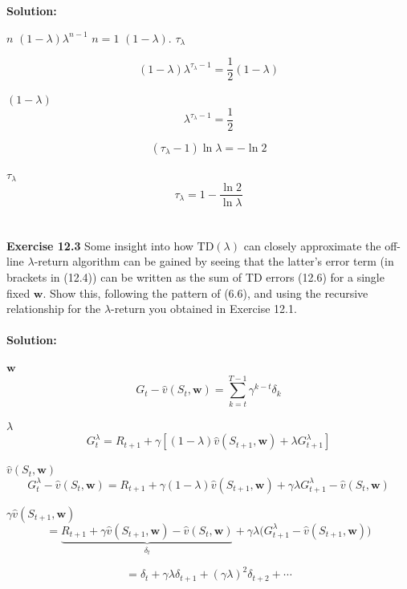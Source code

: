 \documentclass{article}
\begin{document}
\textbf{Solution:}

 $n$  $(1-\lambda)\lambda^{n-1}$ $n=1$  $(1-\lambda)$.
 $\tau_\lambda$ 

\[
(1-\lambda)\lambda^{\tau_\lambda - 1} = \frac{1}{2}(1-\lambda)
\]

 $(1-\lambda)$\text{:}
\[
\lambda^{\tau_\lambda - 1} = \frac{1}{2}
\]

\[
(\tau_\lambda - 1)\ln\lambda = -\ln 2
\]

 $\tau_\lambda$\text{:}
\[
\boxed{\tau_\lambda = 1 - \frac{\ln 2}{\ln \lambda}}
\]
\\\\
\textbf{Exercise 12.3} \quad Some insight into how $\text{TD}(\lambda)$ can closely approximate the 
off-line $\lambda$-return algorithm can be gained by seeing that the latter's error term 
(in brackets in (12.4)) can be written as the sum of TD errors (12.6) for a single fixed 
$\mathbf{w}$. Show this, following the pattern of (6.6), and using the recursive relationship 
for the $\lambda$-return you obtained in Exercise 12.1.
\\
\\

\textbf{Solution:}

 $\mathbf{w}$\text{:}
\[
G_t - \hat{v}(S_t, \mathbf{w}) = \sum_{k=t}^{T-1}\gamma^{k-t}\delta_k
\]

 $\lambda$
\[
G_t^\lambda = R_{t+1} + \gamma\left[(1-\lambda)\hat{v}(S_{t+1},\mathbf{w}) + \lambda G_{t+1}^\lambda\right]
\]

 $\hat{v}(S_t, \mathbf{w})$ 
\[
G_t^\lambda - \hat{v}(S_t,\mathbf{w}) = R_{t+1} + \gamma(1-\lambda)\hat{v}(S_{t+1},\mathbf{w}) 
+ \gamma\lambda G_{t+1}^\lambda - \hat{v}(S_t,\mathbf{w})
\]

 $\gamma\hat{v}(S_{t+1},\mathbf{w})$\text{:}
\[
= \underbrace{R_{t+1} + \gamma\hat{v}(S_{t+1},\mathbf{w}) - \hat{v}(S_t,\mathbf{w})}_{\delta_t} 
+ \gamma\lambda\bigl(G_{t+1}^\lambda - \hat{v}(S_{t+1},\mathbf{w})\bigr)
\]

\[
= \delta_t + \gamma\lambda\delta_{t+1} + (\gamma\lambda)^2\delta_{t+2} + \cdots
\]
\end{document}
